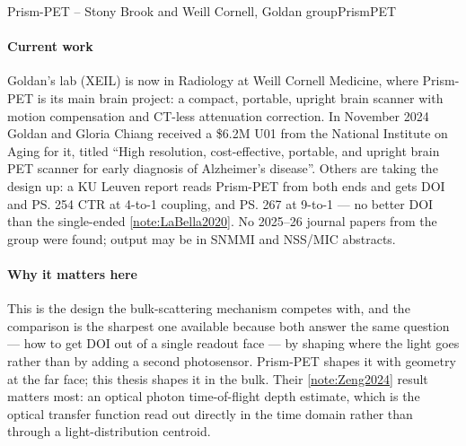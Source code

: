 \begin{programnote}{Prism-PET -- Stony Brook and Weill Cornell, Goldan group}{PrismPET}
\paragraph{Current work}
Goldan's lab (XEIL) is now in Radiology at Weill Cornell Medicine, where
Prism-PET is its main brain project: a compact, portable, upright brain
scanner with motion compensation and CT-less attenuation correction. In
November 2024 Goldan and Gloria Chiang received a \$6.2M U01 from the National
Institute on Aging for it, titled ``High resolution, cost-effective, portable,
and upright brain PET scanner for early diagnosis of Alzheimer's disease''.
Others are taking the design up: a KU Leuven report reads Prism-PET from both
ends and gets  DOI and \ps{254} CTR at 4-to-1 coupling,  and
\ps{267} at 9-to-1 --- no better DOI than the single-ended
\ref{note:LaBella2020}. No 2025--26 journal papers from the group were found;
output may be in SNMMI and NSS/MIC abstracts.

\paragraph{Why it matters here}
This is the design the bulk-scattering mechanism competes with, and the
comparison is the sharpest one available because both answer the same question
--- how to get DOI out of a single readout face --- by shaping where the light
goes rather than by adding a second photosensor. Prism-PET shapes it with
geometry at the far face; this thesis shapes it in the bulk. Their
\ref{note:Zeng2024} result matters most: an optical photon time-of-flight depth
estimate, which is the optical transfer function read out directly in the time
domain rather than through a light-distribution centroid.


\end{programnote}
